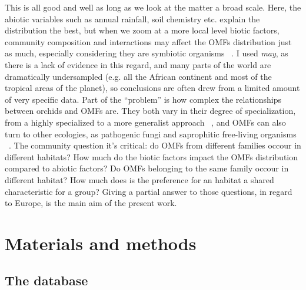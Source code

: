 This is all good and well as long as we look at the matter a broad scale. Here, the abiotic variables such as annual rainfall, soil chemistry etc. explain the distribution the best, but when we zoom at a more local level biotic factors, community composition and interactions may affect the OMFs distribution just as much, especially considering they are symbiotic organisms ~\citep{jacquemyn2017}. I used \emph{may}, as there is a lack of evidence in this regard, and many parts of the world are dramatically undersampled (e.g. all the African continent and most of the tropical areas of the planet), so conclusions are often drew from a limited amount of very specific data. Part of the ``problem'' is how complex the relationships between orchids and OMFs are. They both vary in their degree of specialization, from a highly specialized to a more generalist approach ~\citep{mccormick2004, girlanda2011, heijden2015}, and OMFs can also turn to other ecologies, as pathogenic fungi and saprophitic free-living organisms ~\citep{veldre2013}.
The community question it's critical: do OMFs from different families occour in different habitats? How much do the biotic factors impact the OMFs distribution compared to abiotic factors?
Do OMFs belonging to the same family occour in different habitat? How much does is the preference for an habitat a shared characteristic for a group?
Giving a partial answer to those questions, in regard to Europe, is the main aim of the present work.

\part{Materials and methods}
\label{materialsandmethods}

\chapter{The database}
\label{thedatabase}

